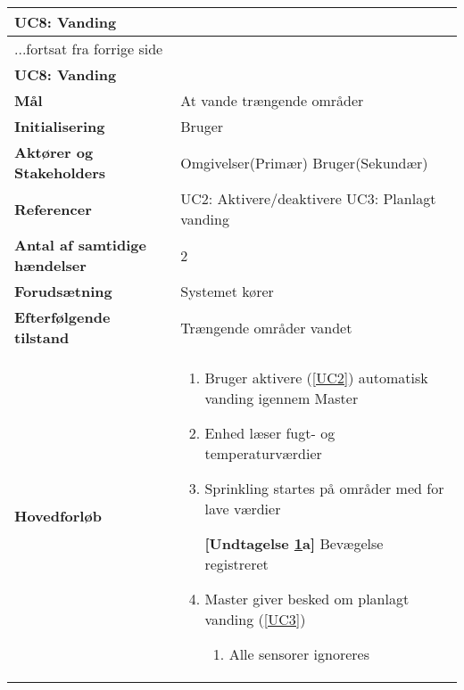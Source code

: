 \begin{center} \centering
	\begin{longtable}{|p{6cm}|p{8cm}|}  %
	\hline
		\multicolumn{2}{|l|}{\textbf{UC8: Vanding}} 		\\\hline %
		\endfirsthead
		
		\multicolumn{2}{l}{...fortsat fra forrige side} 	\\ \hline %
		\multicolumn{2}{|l|}{\textbf{UC8: Vanding}} 		\\\hline %
		\endhead	
		
		\textbf{Mål}								&At vande trængende områder	\\\hline
		\textbf{Initialisering}					&Bruger						\\\hline
		\textbf{Aktører og Stakeholders}			&Omgivelser(Primær)			\newline
												 Bruger(Sekundær)			\\\hline
		\textbf{Referencer}						&UC2: Aktivere/deaktivere 	\newline 
												 UC3: Planlagt vanding		\\\hline
		\textbf{Antal af samtidige hændelser}	&2							\\\hline
		\textbf{Forudsætning}					&Systemet kører				\\\hline
		\textbf{Efterfølgende tilstand}			&Trængende områder vandet	\\\hline
		\textbf{Hovedforløb}					
			&\begin{enumerate}
	
				\item Bruger aktivere (\ref{UC2}) automatisk vanding igennem Master
				
				\item Enhed læser fugt- og temperaturværdier
				
				\item \label{uc8sprinkler} Sprinkling startes på områder med for lave værdier
				
					\textbf{[Undtagelse \ref{uc8sprinkler}a]} Bevægelse registreret
				
				\item Master giver besked om planlagt vanding (\ref{UC3})
				
				\begin{enumerate}
					
					\item Alle sensorer ignoreres
					

\end{enumerate}
\end{enumerate}
\end{longtable}
\end{center}
